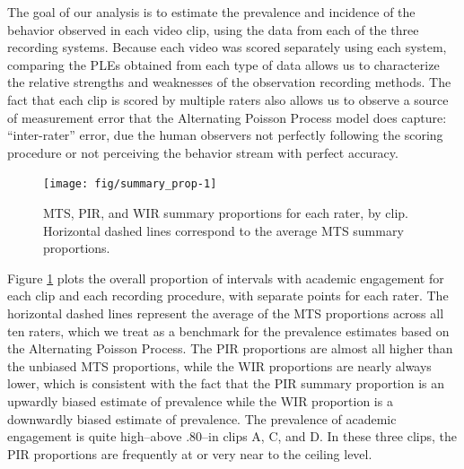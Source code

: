 \documentclass[man, noextraspace, floatsintext]{apa6}\usepackage[]{graphicx}\usepackage[]{color}
\newenvironment{knitrout}{}{} %
\begin{document}
The goal of our analysis is to estimate the prevalence and incidence of the behavior observed in each video clip, using the data from each of the three recording systems. 
Because each video was scored separately using each system, comparing the PLEs obtained from each type of data allows us to characterize the relative strengths and weaknesses of the observation recording methods. The fact that each clip is scored by multiple raters also allows us to observe a source of measurement error that the Alternating Poisson Process model does capture: ``inter-rater'' error, due the human observers not perfectly following the scoring procedure or not perceiving the behavior stream with perfect accuracy.

\begin{knitrout}
\color{fgcolor}\begin{figure}[tb]

{\centering \texttt{[image: fig/summary\_prop-1]} 

}

\caption[MTS, PIR, and WIR summary proportions for each rater, by clip]{MTS, PIR, and WIR summary proportions for each rater, by clip. Horizontal dashed lines correspond to the average MTS summary proportions.}\label{fig:summary_prop}
\end{figure}


\end{knitrout}

Figure \ref{fig:summary_prop} plots the overall proportion of intervals with academic engagement for each clip and each recording procedure, with separate points for each rater. The horizontal dashed lines represent the average of the MTS proportions across all ten raters, which we treat as a benchmark for the prevalence estimates based on the Alternating Poisson Process. The PIR proportions are almost all higher than the unbiased MTS proportions, while the WIR proportions are nearly always lower, which is consistent with the fact that the PIR summary proportion is an upwardly biased estimate of prevalence while the WIR proportion is a downwardly biased estimate of prevalence. The prevalence of academic engagement is quite high--above .80--in clips A, C, and D. In these three clips, the PIR proportions are frequently at or very near to the ceiling level. 
\end{document}
